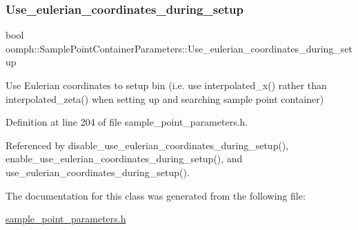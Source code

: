 \subsubsection{\texorpdfstring{Use\+\_\+eulerian\+\_\+coordinates\+\_\+during\+\_\+setup}{Use\_eulerian\_coordinates\_during\_setup}}
{\footnotesize\ttfamily bool oomph\+::\+Sample\+Point\+Container\+Parameters\+::\+Use\+\_\+eulerian\+\_\+coordinates\+\_\+during\+\_\+setup\hspace{0.3cm}{\ttfamily [protected]}}



Use Eulerian coordinates to setup bin (i.\+e. use interpolated\+\_\+x() rather than interpolated\+\_\+zeta() when setting up and searching sample point container) 



Definition at line 204 of file sample\+\_\+point\+\_\+parameters.\+h.



Referenced by disable\+\_\+use\+\_\+eulerian\+\_\+coordinates\+\_\+during\+\_\+setup(), enable\+\_\+use\+\_\+eulerian\+\_\+coordinates\+\_\+during\+\_\+setup(), and use\+\_\+eulerian\+\_\+coordinates\+\_\+during\+\_\+setup().



The documentation for this class was generated from the following file\+:\begin{DoxyCompactItemize}
\item 
\hyperlink{sample__point__parameters_8h}{sample\+\_\+point\+\_\+parameters.\+h}\end{DoxyCompactItemize}
